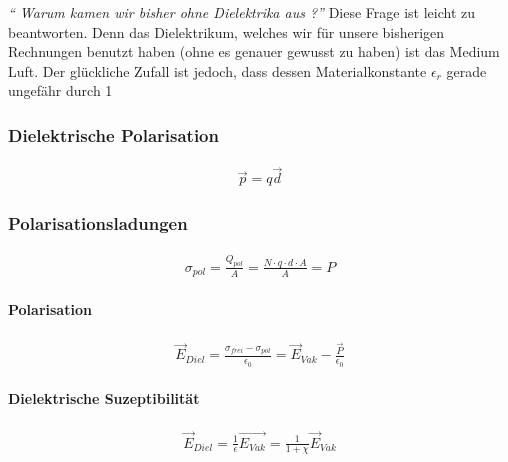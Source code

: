 \textit{\quote  "` Warum kamen wir bisher ohne Dielektrika aus ?"'}
Diese Frage ist leicht zu beantworten. Denn das Dielektrikum, welches wir für unsere bisherigen Rechnungen benutzt haben (ohne es genauer gewusst zu haben) ist das Medium Luft. Der glückliche Zufall ist jedoch, dass dessen Materialkonstante $\epsilon_r$ gerade ungefähr durch 1  
\subsubsection{Dielektrische Polarisation}
\begin{align} \label{eqn:Polarisation}
\vec{p} = q \vec{d}
\end{align}

\subsubsection{Polarisationsladungen}
\begin{align} \label{eqn:Polarisationsladung}
\sigma_{pol}= \frac{Q_{pol}}{A} = \frac{N \cdot q \cdot d \cdot A}{A} = P
\end{align}

	\paragraph{Polarisation}\begin{align} \label{eqn:Polarisation Überlagerung}
\vec{E}_{Diel} = \frac{\sigma_{frei} - \sigma_{pol}}{\epsilon_0} = \vec{E}_{Vak} - \frac{\vec{P}}{\epsilon_0}
\end{align}

\paragraph{Dielektrische Suzeptibilität}
\begin{align} \label{eqn:Dielektrika Feldstärke}
\boxed{\vec{E}_{Diel} = \frac{1}{\epsilon} \vec{E_{Vak}} = \frac{1}{1+ \chi} \vec{E}_{Vak}}
\end{align}
